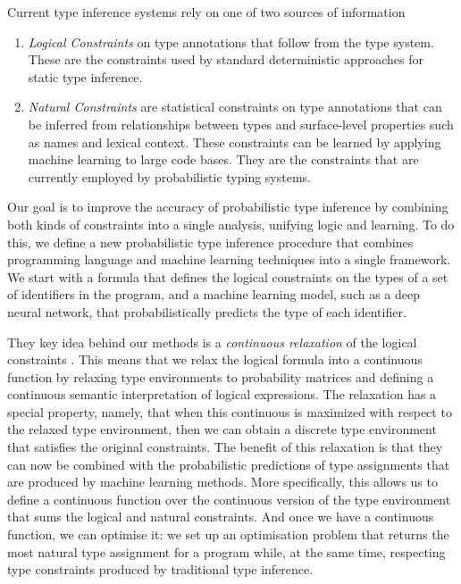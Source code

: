 \documentclass[acmsmall, review, anonymous]{acmart}\settopmatter{printfolios=true,printccs=false,printacmref=false}
\begin{document}
Current type inference systems rely
on one of two sources of information
\begin{enumerate}[label=(\Roman*)]
	\item \emph{Logical Constraints} on type annotations that follow from the type system.
	      These are the  constraints used by standard deterministic approaches for static type inference.
	\item \emph{Natural Constraints} are statistical constraints on type annotations
	      that can be inferred from relationships between types and surface-level properties such as names and lexical context.
	      These constraints can be learned by applying machine learning to large code bases.
	      They are the constraints that are currently employed by probabilistic typing systems.
\end{enumerate}
Our goal is to improve the accuracy of probabilistic type
inference by combining both kinds of constraints into a single analysis, unifying logic and learning.
To do this, we define a new probabilistic type inference procedure that combines
programming language and machine learning techniques into a single framework.
We start with a formula that defines the logical constraints on the types of a set of identifiers in the program,
and a machine learning model, such as a deep neural network, that probabilistically predicts the type of each identifier.

They key idea behind our methods is a
\emph{continuous relaxation} of
the logical constraints \cite{hajek1998}.
This means that  we relax the logical formula into a continuous function by relaxing type environments
to probability matrices and defining
a continuous semantic interpretation of logical expressions.
The relaxation has a special property, namely,
that when this continuous is maximized with respect
to the relaxed type environment, then we
can obtain a discrete type environment
that satisfies the original constraints.
The benefit of this relaxation is that they
can now be combined with the probabilistic
predictions of type assignments that are
produced by machine learning methods.
More specifically, this allows us to define a continuous function over the continuous version of the type environment
that sums the logical and natural constraints.
And once we have a continuous function, we can optimise it:
we set up an optimisation problem that returns the most natural type assignment for a
program while, at the same time, respecting type constraints produced by traditional type inference.
\end{document}
